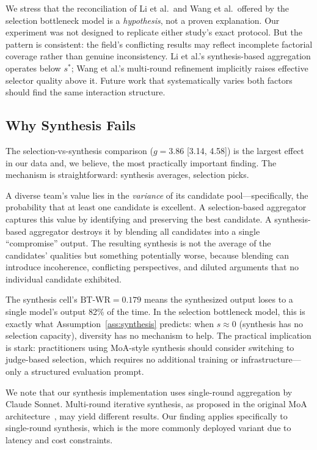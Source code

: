 \documentclass[10pt,twocolumn]{article}
\theoremstyle{remark}
\begin{document}
We stress that the reconciliation of Li et al.\ and Wang et al.\ offered by the selection bottleneck model is a \emph{hypothesis}, not a proven explanation. Our experiment was not designed to replicate either study's exact protocol. But the pattern is consistent: the field's conflicting results may reflect incomplete factorial coverage rather than genuine inconsistency. Li et al.'s synthesis-based aggregation operates below $s^*$; Wang et al.'s multi-round refinement implicitly raises effective selector quality above it. Future work that systematically varies both factors should find the same interaction structure.

\subsection{Why Synthesis Fails}
\label{sec:whysynth}

The selection-vs-synthesis comparison ($g = 3.86$ [3.14, 4.58]) is the largest effect in our data and, we believe, the most practically important finding. The mechanism is straightforward: synthesis averages, selection picks.

A diverse team's value lies in the \emph{variance} of its candidate pool---specifically, the probability that at least one candidate is excellent. A selection-based aggregator captures this value by identifying and preserving the best candidate. A synthesis-based aggregator destroys it by blending all candidates into a single ``compromise'' output. The resulting synthesis is not the average of the candidates' qualities but something potentially worse, because blending can introduce incoherence, conflicting perspectives, and diluted arguments that no individual candidate exhibited.

The synthesis cell's $\mathrm{BT\text{-}WR} = 0.179$ means the synthesized output loses to a single model's output 82\% of the time. In the selection bottleneck model, this is exactly what Assumption~\ref{ass:synthesis} predicts: when $s \approx 0$ (synthesis has no selection capacity), diversity has no mechanism to help. The practical implication is stark: practitioners using MoA-style synthesis should consider switching to judge-based selection, which requires no additional training or infrastructure---only a structured evaluation prompt.

We note that our synthesis implementation uses single-round aggregation by Claude Sonnet. Multi-round iterative synthesis, as proposed in the original MoA architecture~\citep{wang2024mixture}, may yield different results. Our finding applies specifically to single-round synthesis, which is the more commonly deployed variant due to latency and cost constraints.
\end{document}
